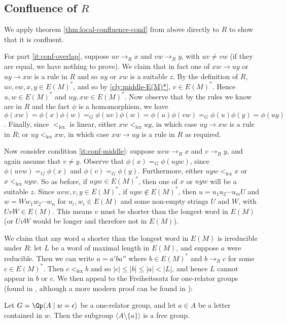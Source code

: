 \documentclass[nosubthm]{lmaths}
\newcommand{\ltlex}{<_{\mathrm{lex}}}
\begin{document}
\subsection{Confluence of $R$}

We apply theorem \ref{thm:local-confluence-cond} from above directly to $R$ to show that it is confluent.

For part \ref{it:conf-overlap}, suppose $uv \to_R x$ and $vw \to_R y$, with $uv \ne vw$ (if they are equal, we have nothing to prove). We claim that in fact one of $xw \to uy$ or $uy \to xw$ is a rule in $R$ and so $uy$ or $xw$ is a suitable $z$. By the definition of $R$, $uv, vw, x, y\in E(M)^*$, and so by \cref{cly:middle-E(M)*}, $v \in E(M)^*$. Hence $u, w \in E(M)^*$ and $uy, xw \in E(M)^*$. Now observe that by the rules we know are in $R$ and the fact $\phi$ is a homomorphism, we have $\phi(xw) = \phi(x)\phi(w) =_G \phi(uv)\phi(w) = \phi(u)\phi(vw) =_G \phi(u)\phi(y) = \phi(uy)$. Finally, since $\ltlex$ is linear, either $xw \ltlex uy$, in which case $uy \to xw$ is a rule in $R$; or $uy \ltlex xw$, in which case $xw \to uy$ is a rule in $R$ as required.

Now consider condition \ref{it:conf-middle}: suppose $uvw \to_R x$ and $v \to_R y$, and again assume that $v \ne y$. Observe that $\phi(x) =_G \phi(uyw)$, since $\phi(uvw) =_G \phi(x)$ and $\phi(v) =_G \phi(y)$. Furthermore, either $uyw \ltlex x$ or $x \ltlex uyw$. So as before, if $uyw \in E(M)^*$, then one of $x$ or $uyw$ will be a suitable $z$. Since $uvw, v, y \in E(M)^*$, if $uyw \not\in E(M)^*$, then $u = u_1u_2 \cdots u_m U$ and $w = W w_1 w_2 \cdots w_n$ for $u_i, w_i \in E(M)$ and some non-empty strings $U$ and $W$, with $UvW \in E(M)$. This means $v$ must be shorter than the longest word in $E(M)$ (or $UvW$ would be longer and therefore not in $E(M)$).

We claim that any word $a$ shorter than the longest word in $E(M)$ is irreducible under $R$: let $L$ be a word of maximal length in $E(M)$, and suppose $a$ were reducible. Then we can write $a = a'ba''$ where $b \in E(M)^*$ and $b \to_R c$ for some $c \in E(M)^*$. Then $c \ltlex b$ and so $|c| \le |b| \le |a| < |L|$, and hence $L$ cannot appear in $b$ or $c$. We then appeal to the Freiheitssatz for one-relator groups (found in \cite{Magnus2004}, although a more modern proof can be found in \cite{Lyndon2001}):

\begin{theorem}[Freiheitssatz]
	Let $G = \Gp \langle A \mid w = \epsilon \rangle$ be a one-relator group, and let $a \in A$ be a letter contained in $w$. Then the subgroup $\langle A \setminus \{a\} \rangle$ is a free group.
\end{theorem}
\end{document}
